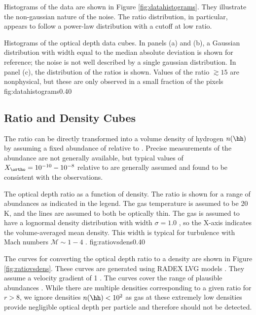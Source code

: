 Histograms of the data are shown in Figure \ref{fig:datahistograms}.  They
illustrate the non-gaussian nature of the noise.  The ratio distribution, in
particular, appears to follow a power-law distribution with a cutoff at low
ratio.

{Histograms of the optical depth data cubes.  In panels (a) and (b),
a Gaussian distribution with width equal to the median absolute deviation
is shown for reference; the noise is not well described by a single gaussian
distribution.  In panel (c), the distribution of the ratios is shown.
Values of the ratio $\gtrsim15$ are nonphysical, but these are only observed
in a small fraction of the pixels}
{fig:datahistograms}{0.4}{0}


\subsection{Ratio and Density Cubes}
\label{sec:ratiodenscubes}
The \formaldehyde ratio can be directly transformed into a volume density of
hydrogen $n(\hh)$ by assuming a fixed abundance of \formaldehyde relative to
\hh.  Precise measurements of the \formaldehyde abundance are not generally
available, but typical values of $X_{\ortho} = 10^{-10}-10^{-8}$ relative to
\hh are generally assumed \citep{Mangum1993a, Ginsburg2011a, Ginsburg2013a,
Ao2013a} and found to be consistent with the observations.

{The optical depth ratio as a function of \hh density.  The ratio is shown for
a range of \formaldehyde abundances as indicated in the legend.
The gas temperature is assumed to be 20 K, and the \formaldehyde lines
are assumed to both be optically thin.  The gas is assumed to have a
lognormal density distribution with width $\sigma=1.0$ \citep[see ][ for
details]{Ginsburg2013a}, so the X-axis indicates the volume-averaged
mean \hh density.  This width is typical for turbulence with Mach numbers
$\mathcal{M}\sim1-4$ \citep{Federrath2008a}.}
{fig:ratiovsdens}{0.4}{0}

The curves for converting the optical depth ratio to a density are shown in
Figure \ref{fig:ratiovsdens}.  These curves are generated using RADEX LVG models
\citep[python wrapper \url{https://github.com/keflavich/pyradex/}; original
code][]{van-Der-Tak2007a}.  They assume a velocity gradient of 1 \kms \perpc.
The curves cover the range of plausible \formaldehyde abundances
\citep{Mangum1993a}.  While there are multiple densities corresponding to a
given ratio for $r>8$, we ignore densities $n(\hh)<10^2$ \percc as gas at these
extremely low densities provide negligible optical depth per particle and
therefore should not be detected.

